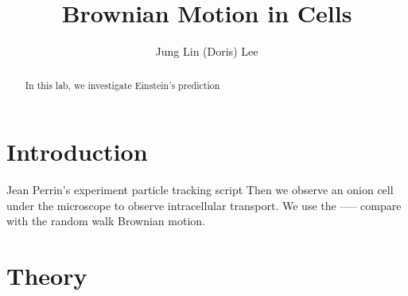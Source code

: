 \documentclass[iop,revtex4]{emulateapj_mod}
\begin{document}
\title{Brownian Motion in Cells}
\author{Jung Lin (Doris) Lee}
 \begin{abstract}
 In this lab, we investigate 
 Einstein's prediction 
 \end{abstract}
\nocite{*}
\section{Introduction}\label{sec:intro}
\par %
Jean Perrin's experiment 
particle tracking script  
Then we observe an onion cell under the microscope to observe intracellular transport. We use the ----- compare with the random walk Brownian motion.
\section{Theory}\label{sec:theory}
\par
\end{document}

